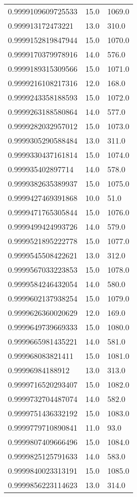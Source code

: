 \begin{center}
\begin{supertabular}[H]{p{0.30\textwidth}p{0.05\textwidth}p{0.05\textwidth}}
0.9999109609725533 & 15.0 & 1069.0 \\ 
0.999913172473221 & 13.0 & 310.0 \\ 
0.9999152819847944 & 15.0 & 1070.0 \\ 
0.9999170379978916 & 14.0 & 576.0 \\ 
0.9999189315309566 & 15.0 & 1071.0 \\ 
0.9999216108217316 & 12.0 & 168.0 \\ 
0.9999243358188593 & 15.0 & 1072.0 \\ 
0.9999263188580864 & 14.0 & 577.0 \\ 
0.9999282032957012 & 15.0 & 1073.0 \\ 
0.9999305290588484 & 13.0 & 311.0 \\ 
0.9999330437161814 & 15.0 & 1074.0 \\ 
0.999935402897714 & 14.0 & 578.0 \\ 
0.9999382635389937 & 15.0 & 1075.0 \\ 
0.9999427469391868 & 10.0 & 51.0 \\ 
0.9999471765305844 & 15.0 & 1076.0 \\ 
0.9999499424993726 & 14.0 & 579.0 \\ 
0.9999521895222778 & 15.0 & 1077.0 \\ 
0.9999545508422621 & 13.0 & 312.0 \\ 
0.9999567033223853 & 15.0 & 1078.0 \\ 
0.9999584246432054 & 14.0 & 580.0 \\ 
0.9999602137938254 & 15.0 & 1079.0 \\ 
0.9999626360020629 & 12.0 & 169.0 \\ 
0.9999649739669333 & 15.0 & 1080.0 \\ 
0.9999665981435221 & 14.0 & 581.0 \\ 
0.999968083821411 & 15.0 & 1081.0 \\ 
0.99996984188912 & 13.0 & 313.0 \\ 
0.9999716520293407 & 15.0 & 1082.0 \\ 
0.9999732704487074 & 14.0 & 582.0 \\ 
0.9999751436332192 & 15.0 & 1083.0 \\ 
0.9999779710890841 & 11.0 & 93.0 \\ 
0.9999807409666496 & 15.0 & 1084.0 \\ 
0.9999825125791633 & 14.0 & 583.0 \\ 
0.9999840023313191 & 15.0 & 1085.0 \\ 
0.9999856223114623 & 13.0 & 314.0 \\ 

\end{supertabular}
\end{center}
